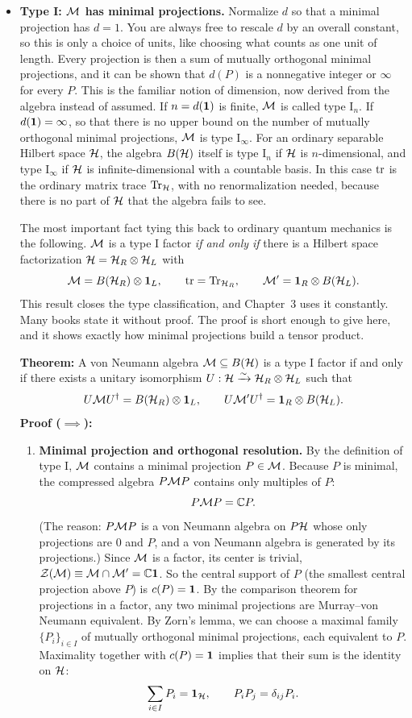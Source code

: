 \begin{itemize}
\item \textbf{Type I: $\mathcal{M}$ has minimal projections.} Normalize $d$ so that a minimal projection has $d=1$.
You are always free to rescale $d$ by an overall constant, so this is only a choice of units, like choosing
what counts as one unit of length. Every projection is then a sum of mutually orthogonal minimal
projections, and it can be shown that $d(P)$ is a nonnegative integer or $\infty$ for every $P$. This is the
familiar notion of dimension, now derived from the algebra instead of assumed. If $n=d(\mathbf{1})$ is finite, $\mathcal{M}$
is called type $\mathrm I_n$. If $d(\mathbf{1})=\infty$, so that there is no upper bound on the number of mutually
orthogonal minimal projections, $\mathcal{M}$ is type $\mathrm I_\infty$. For an ordinary separable Hilbert space
$\mathcal{H}$, the algebra $B(\mathcal{H})$ itself is type $\mathrm I_n$ if $\mathcal{H}$ is $n$-dimensional, and type
$\mathrm I_\infty$ if $\mathcal{H}$ is infinite-dimensional with a countable basis. In this case $\operatorname{tr}$ is the ordinary
matrix trace $\operatorname{Tr}_{\mathcal{H}}$, with no renormalization needed, because there is no part of $\mathcal{H}$ that the algebra
fails to see.

The most important fact tying this back to ordinary quantum mechanics is the following. $\mathcal{M}$ is a type I
factor \emph{if and only if} there is a Hilbert space factorization $\mathcal{H}=\mathcal{H}_R\otimes\mathcal{H}_L$ with
\[
\mathcal{M}=B(\mathcal{H}_R)\otimes\mathbf{1}_L, \qquad \operatorname{tr}=\operatorname{Tr}_{\mathcal{H}_R}, \qquad \mathcal{M}'=\mathbf{1}_R\otimes B(\mathcal{H}_L) .
\]
This result closes the type classification, and Chapter~3 uses it constantly. Many books state it without
proof. The proof is short enough to give here, and it shows exactly how minimal projections build a tensor
product.

\begin{keyresult}
\textbf{Theorem:} A von Neumann algebra $\mathcal{M} \subseteq B(\mathcal{H})$ is a type I factor if and only if there exists a
unitary isomorphism $U: \mathcal{H} \xrightarrow{\sim} \mathcal{H}_R \otimes \mathcal{H}_L$ such that
\[
U \mathcal{M} U^\dagger = B(\mathcal{H}_R) \otimes \mathbf{1}_L, \qquad U \mathcal{M}' U^\dagger = \mathbf{1}_R \otimes B(\mathcal{H}_L) .
\]
\textbf{Proof ($\implies$):}
\begin{enumerate}[leftmargin=*]
\item \textbf{Minimal projection and orthogonal resolution.}
By the definition of type I, $\mathcal{M}$ contains a minimal projection $P \in \mathcal{M}$. Because $P$ is minimal, the
compressed algebra $P\mathcal{M} P$ contains only multiples of $P$:
\[
P \mathcal{M} P = \mathbb{C} P .
\]
(The reason: $P\mathcal{M} P$ is a von Neumann algebra on $P\mathcal{H}$ whose only projections are $0$ and $P$, and a von
Neumann algebra is generated by its projections.) Since $\mathcal{M}$ is a factor, its center is trivial,
$\mathcal{Z}(\mathcal{M}) \equiv \mathcal{M} \cap \mathcal{M}' = \mathbb{C}\mathbf{1}$. So the central support of $P$ (the smallest central
projection above $P$) is $c(P) = \mathbf{1}$. By the comparison theorem for projections in a factor, any two minimal
projections are Murray--von Neumann equivalent. By Zorn's lemma, we can choose a maximal family
$\{P_i\}_{i \in I}$ of mutually orthogonal minimal projections, each equivalent to $P$. Maximality together
with $c(P)=\mathbf{1}$ implies that their sum is the identity on $\mathcal{H}$:
\[
\sum_{i \in I} P_i = \mathbf{1}_{\mathcal{H}}, \qquad P_i P_j = \delta_{ij} P_i .
\]


\end{enumerate}
\end{keyresult}
\end{itemize}
